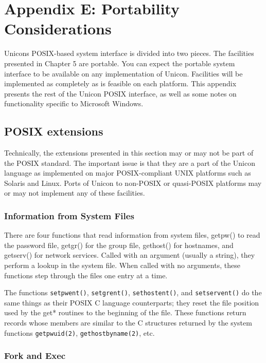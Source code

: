 \clearpage\section{Appendix E: Portability Considerations}

Unicon{\textquotesingle}s POSIX-based system interface is divided into
two pieces. The facilities presented in Chapter 5 are portable. You can
expect the portable system interface to be available on any
implementation of Unicon. Facilities will be implemented as completely
as is feasible on each platform. This appendix presents the rest of the
Unicon POSIX interface, as well as some notes on functionality specific
to Microsoft Windows.

\subsection[POSIX extensions]{POSIX extensions}

Technically, the extensions presented in this
section may or may not be part of the POSIX standard. The important
issue is that they are a part of the Unicon language as implemented on
major POSIX-compliant UNIX platforms such as Solaris and Linux. Ports
of Unicon to non-POSIX or quasi-POSIX platforms may or may not
implement any of these facilities.

\subsubsection{Information from System Files}

There are four functions that read information from system files,
getpw() to read the password file, getgr() for the group file,
gethost() for hostnames, and getserv() for network services. Called
with an argument (usually a string), they perform a lookup in the
system file. When called with no arguments, these functions step
through the files one entry at a time.

The functions \texttt{setpwent()}, \texttt{setgrent()},
\texttt{sethostent()}, and \texttt{setservent()} do
the same things as their POSIX C language counterparts; they reset the
file position used by the get* routines to the beginning of the file.
These functions return records whose members are similar to the C
structures returned by the system functions \texttt{getpwuid(2)},
\texttt{gethostbyname(2)}, etc.

\subsubsection{Fork and Exec}

